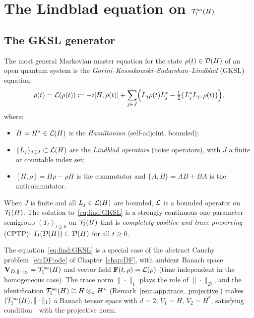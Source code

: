 \section{The Lindblad equation on $\mathcal{T}_{1}^{sa}(H)$}
\label{sec:lind:equation}

\subsection*{The GKSL generator}

The most general Markovian master equation for the state $\rho(t)
\in \mathcal{D}(H)$ of an open quantum system is the
\emph{Gorini--Kossakowski--Sudarshan--Lindblad} (GKSL) equation:
\begin{equation}
\label{eq:lind:GKSL}
    \dot\rho(t) = \mathcal{L}(\rho(t))
    \coloneqq -i[H, \rho(t)]
    + \sum_{j \in J} \Bigl(
    L_j \rho(t) L_j^*
    - \tfrac{1}{2}\{L_j^* L_j, \rho(t)\}
    \Bigr),
\end{equation}
where:
\begin{itemize}
\item $H = H^* \in \mathcal{L}(H)$ is the \emph{Hamiltonian} (self-adjoint,
    bounded);
\item $\{L_j\}_{j \in J} \subset \mathcal{L}(H)$ are the \emph{Lindblad
    operators} (noise operators), with $J$ a finite or countable index set;
\item $[H, \rho] = H\rho - \rho H$ is the commutator and
    $\{A, B\} = AB + BA$ is the anticommutator.
\end{itemize}
When $J$ is finite and all $L_j \in \mathcal{L}(H)$ are bounded, $\mathcal{L}$ is a
bounded operator on $\mathcal{T}_{1}(H)$. The solution to~\eqref{eq:lind:GKSL}
is a strongly continuous one-parameter semigroup $(T_t)_{t \geq 0}$ on
$\mathcal{T}_{1}(H)$ that is \emph{completely positive and trace preserving}
(CPTP): $T_t(\mathcal{D}(H)) \subset \mathcal{D}(H)$ for all $t \geq 0$.

\begin{remark}
\label{rem:lind:tensor_ODE}
The equation~\eqref{eq:lind:GKSL} is a special case of the abstract
Cauchy problem~\eqref{eq:DF:ode} of Chapter~\ref{chap:DF}, with ambient
Banach space $\mathbf{V}_{D,\|\cdot\|_D} = \mathcal{T}_{1}^{sa}(H)$ and vector field
$\mathbf{F}(t, \rho) = \mathcal{L}(\rho)$ (time-independent in the homogeneous case).
The trace norm $\|\cdot\|_1$ plays the role of $\|\cdot\|_D$, and the
identification $\mathcal{T}_{1}^{sa}(H) \cong H \otimes_\pi H^*$ (Remark~\ref{rem:app:trace_projective})
makes $(\mathcal{T}_{1}^{sa}(H), \|\cdot\|_1)$ a Banach tensor space with $d=2$,
$V_1 = H$, $V_2 = H^*$, satisfying condition~\condINJ\ with the
projective norm.
\end{remark}

